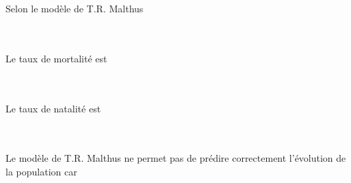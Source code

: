 \documentclass[oneside,12pt]{article}          %
\begin{document}
\newpage



\begin{tcolorbox}[
    enhanced , arc = 3pt , top = 4mm ,
    fonttitle = \bfseries , title = Je retiens  , boxed title style = {arc = 3pt} ,
    coltitle = black , colbacktitle = white ,
    attach boxed title to top left = {xshift = 5mm , yshift = -4mm} ,
	]
	\restoreskip
	
	Selon le modèle de T.R. Malthus \dotfill \\[5pt] \phantom{} \dotfill \\[5pt] \phantom{} \dotfill \\[5pt] \phantom{} \dotfill 

	\bigskip
	
	Le taux de mortalité est \dotfill \\[5pt] \phantom{} \dotfill \\[5pt] \phantom{} \dotfill \\[5pt] \phantom{} \dotfill
	
	\bigskip
	
	Le taux de natalité est \dotfill \\[5pt] \phantom{} \dotfill \\[5pt] \phantom{} \dotfill \\[5pt] \phantom{} \dotfill
	
	\bigskip
	
	Le modèle de T.R. Malthus ne permet pas de prédire correctement l'évolution de la population car
	
	\dotfill \\[5pt] \phantom{} \dotfill \\[5pt] \phantom{} \dotfill \\[5pt] \phantom{} \dotfill \\[5pt] \phantom{} \dotfill \\[5pt] \phantom{} \dotfill \\[5pt] \phantom{} \dotfill
\end{tcolorbox}
\end{document}
